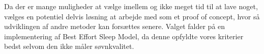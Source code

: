 Da der er mange muligheder at vælge imellem og ikke meget tid til at lave noget, vælges en potentiel delvis løsning at arbejde med som et proof of concept, hvor så udviklingen af andre metoder kan forsættes senere.
Valget falder på en implementering af Best Effort Sleep Model, da denne opfyldte vores kriterier bedst selvom den ikke måler søvnkvalitet.

\begin{comment}
\subsection{Søvnanalyse i PsyLog}
\winde{Ikke sikker på at det her skal med her}
\lars{Enig med Winde i at det nok ikke skal være her, hvis det skal, så nævn Toss 'N' Turn og skriv en del om sikkert}
Da søvnmønstre er en god indikator på en persons helbred \lars{skal source til}, og i mange tilfælde også på den psykiske tilstand, er det meget relevant for det hjælpeværktøj der er under udvikling til personer med uni- og bipolar depression.
I dette projekt er der et ønske om at selve dataindsamlingen kræver så lidt som muligt af brugeren, hvor det foretrukne er at brugeren bruger sin telefon og agerer i sin hverdag som de plejer.

Netop fordi vi gerne vil have så lidt krav til brugeropførsel som muligt vil vi kraftigt foretrække en metode som ikke kræver noget af brugeren, hvilket kan være Best Effort Sleep (BES) Model eller noget lignende. 
Dog har vi det problem at det ikke har været muligt for os at finde en præcis beskrivelse af hvordan BES fortolker de forskellige datakilder så det vil være noget vi selv skal forsøge at genskabe.
Dog ved vi ud fra denne artikel at det er muligt at gøre, hvilket betyder at det er en reel mulighed.
Der er også det problem, at denne fremgangsmåde kun kan beregne søvnlængden og ikke søvn kvalitet, som mange også mener er ganske relevant da et af de beskrivende kriterier for et depressions stadie er at ens søvn er ustabil eller af dårlig kvalitet.
Manglen på denne egenskab gør at BES alene ikke er beskrivende nok til at dække alle kriterier, hvilket vil sige at vi burde udforske andre mulighed for søvnestimering, dog kan BES stadig en meget valid mulighed for estimering af søvnlængde.


\end{comment}

